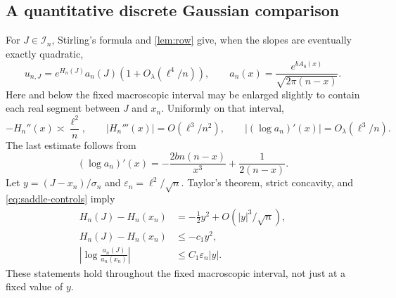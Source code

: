\documentclass[11pt,a4paper]{article}
\theoremstyle{definition}
\newcommand{\epsn}{\varepsilon_n}
\numberwithin{equation}{section}
\begin{document}
\subsection{A quantitative discrete Gaussian comparison}
For \(J\in\mathcal I_n\), Stirling's formula and \cref{lem:row} give,
when the slopes are eventually exactly quadratic,
\begin{equation}
 u_{n,J}=e^{H_n(J)}a_n(J)
               \left(1+O_\lambda(\ell^4/n)\right),\qquad
 a_n(x)=\frac{e^{bA_0(x)}}{\sqrt{2\pi(n-x)}}.
 \label{eq:row-saddle}
\end{equation}
Here and below the fixed macroscopic interval may be enlarged slightly to
contain each real segment between \(J\) and \(x_n\).
Uniformly on that interval,
\begin{equation}
 -H_n''(x)\asymp\frac{\ell^2}{n},\qquad
 |H_n'''(x)|=O(\ell^3/n^2),\qquad
 |(\log a_n)'(x)|=O_\lambda(\ell^3/n).
 \label{eq:saddle-controls}
\end{equation}
The last estimate follows from
\[
 (\log a_n)'(x)=-\frac{2bn(n-x)}{x^3}+\frac1{2(n-x)}.
\]
Let \(y=(J-x_n)/\sigma_n\) and
\(\epsn=\ell^2/\sqrt n\). Taylor's theorem, strict concavity, and
\eqref{eq:saddle-controls} imply
\begin{align}
 H_n(J)-H_n(x_n)&=-\tfrac12y^2+O(|y|^3/\sqrt n),
                                                        \label{eq:HTaylor}\\
 H_n(J)-H_n(x_n)&\le-c_1y^2,                 \label{eq:Hdomination}\\
 \left|\log\frac{a_n(J)}{a_n(x_n)}\right|
                       &\le C_1\epsn|y|.    \label{eq:amp-control}
\end{align}
These statements hold throughout the fixed macroscopic interval, not just
at a fixed value of \(y\).
\end{document}

